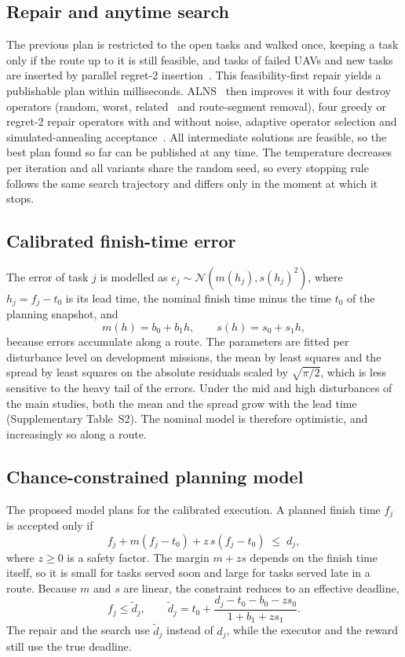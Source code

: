 \subsection{Repair and anytime search}
The previous plan is restricted to the open tasks and walked once, keeping a task only if the route up to it is still
feasible, and tasks of failed UAVs and new tasks are inserted by parallel regret-2
insertion~\cite{potvin1993parallel,ropke2006adaptive}. This feasibility-first repair yields a publishable plan within
milliseconds. ALNS~\cite{ropke2006adaptive} then improves it with four destroy operators (random, worst,
related~\cite{shaw1998cp} and route-segment removal), four greedy or regret-2 repair operators with and without noise,
adaptive operator selection and simulated-annealing acceptance~\cite{kirkpatrick1983annealing}. All intermediate
solutions are feasible, so the best plan found so far can be published at any time. The temperature decreases per
iteration and all variants share the random seed, so every stopping rule follows the same search trajectory and differs
only in the moment at which it stops.

\subsection{Calibrated finish-time error}
The error of task $j$ is modelled as $e_j\sim\mathcal{N}(m(h_j),s(h_j)^2)$, where $h_j=f_j-t_0$ is its lead time, the
nominal finish time minus the time $t_0$ of the planning snapshot, and
\begin{equation}\label{eq:errmodel}
m(h)=b_0+b_1h,\qquad s(h)=s_0+s_1h ,
\end{equation}
because errors accumulate along a route. The parameters are fitted per disturbance level on development missions, the
mean by least squares and the spread by least squares on the absolute residuals scaled by $\sqrt{\pi/2}$, which is less
sensitive to the heavy tail of the errors. Under the mid and high disturbances of the main studies, both the mean and
the spread grow with the lead time (Supplementary Table~S2). The nominal model is therefore optimistic, and
increasingly so along a route.

\subsection{Chance-constrained planning model}\label{sec:cc}
The proposed model plans for the calibrated execution. A planned finish time $f_j$ is accepted only if
\begin{equation}\label{eq:ccfinish}
f_j+m(f_j-t_0)+z\,s(f_j-t_0)\;\le\;d_j ,
\end{equation}
where $z\ge0$ is a safety factor. The margin $m+zs$ depends on the finish time itself, so it is small for tasks served
soon and large for tasks served late in a route. Because $m$ and $s$ are linear, the constraint reduces to an effective
deadline,
\begin{equation}\label{eq:cc}
f_j\le\tilde d_j,\qquad \tilde d_j=t_0+\frac{d_j-t_0-b_0-z s_0}{1+b_1+z s_1}.
\end{equation}
The repair and the search use $\tilde d_j$ instead of $d_j$, while the executor and the reward still use the true
deadline.

